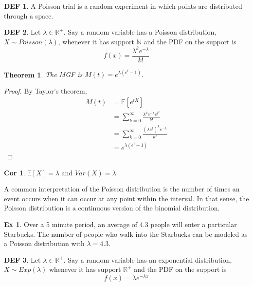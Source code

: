 \documentclass{article}
\newtheorem{theorem}{Theorem}
\theoremstyle{definition}\newtheorem{definition}{DEF}
\theoremstyle{definition}\newtheorem{example}{Ex}
\theoremstyle{lemma}\newtheorem{lemma}{Lemma}
\theoremstyle{corrolary}\newtheorem{corrolary}{Cor}
\begin{document}
\begin{definition}
A Poisson trial is a random experiment in which points are distributed through a space.
\end{definition}

\begin{definition}
Let $\lambda \in \mathbb{R}^+$.
Say a random variable has a Poisson distribution, $X\sim Poisson(\lambda)$, whenever it has support $\mathbb{N}$ and the PDF on the support is
\begin{equation}
f(x)=\frac{\lambda^k e^{-\lambda}}{k!}
\end{equation}
\end{definition}

\begin{theorem}
The MGF is $M(t)=e^{\lambda (e^t-1)}$.
\end{theorem}
\begin{proof}
By Taylor's theorem,
\begin{align*}
M(t)&=\mathbb{E}[e^{tX}]\\
&=\sum_{k=0}^\infty \frac{\lambda^k e^{-\lambda}e^{t^k}}{k!}\\
&=\sum_{k=0}^\infty \frac{(\lambda e^t)^ke^{-\lambda}}{k!}\\
&=e^{\lambda (e^t-1)}
\end{align*}
\end{proof}
\begin{corrolary}
$\mathbb{E}[X]=\lambda$ and $Var(X)=\lambda$
\end{corrolary}

A common interpretation of the Poisson distribution is the number of times an event occurs when it can occur at any point within the interval.
In that sense, the Poisson distribution is a continuous version of the binomial distribution.\\

\begin{example}
Over a 5 minute period, an average of 4.3 people will enter a particular Starbucks.
The number of people who walk into the Starbucks can be modeled as a Poisson distribution with $\lambda=4.3$.
\end{example}

\begin{definition}
Let $\lambda \in \mathbb{R}^+$.
Say a random variable has an exponential distribution, $X\sim Exp(\lambda)$ whenever it has support $\mathbb{R}^+$ and the PDF on the support is
\begin{equation}
f(x)=\lambda e^{-\lambda x}
\end{equation}
\end{definition}
\end{document}

